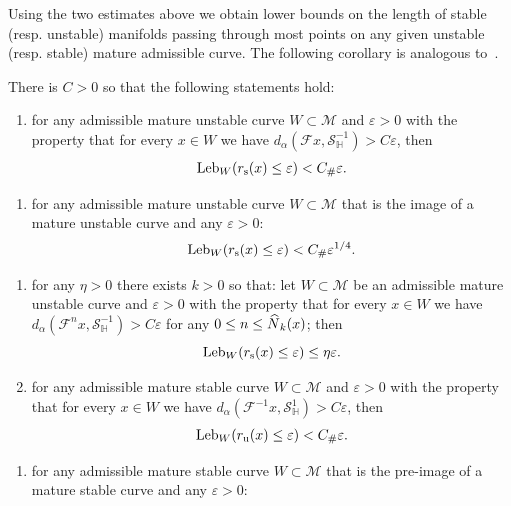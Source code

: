 \documentclass[10pt]{amsart}
\theoremstyle{definition}\newtheorem{defi}[theo]{Definition}\newtheorem{rema}[theo]{Remark}\newtheorem{exam}[theo]{Example}\newtheorem{exem}[theo]{Example}\newtheorem{nota}[theo]{Notation}
\newcommand{\eps}{\varepsilon}
\newcommand{\inv}{^{-1}}
\newcommand{\unstable}{\text{u}}
\newcommand{\stable}{\text{s}}
\newcommand{\homo}{\mathbb{H}}
\newcommand{\cm}{\mathcal{F}}
\newcommand{\csp}{\mathcal{M}}
\newcommand{\rs}{r_{\stable}}
\newcommand{\ru}{r_{\unstable}}
\newcommand{\singPrivate}{\mathcal{S}}
\newcommand{\hsing}[1]{{\singPrivate}_\homo^{#1}}
\newcommand{\admiss}{admissible}
\newcommand{\adm}{_{\alpha^{+}}}
\newcommand{\Np}{\hat N}
\newcommand{\Leb}{\textup{Leb}}
\newcommand{\Const}{C_\#}
\renewcommand{\adm}{_{\alpha}}
\newcommand*{\relabel}{\renewcommand{\labelenumi}{(\theenumi)}}
\newcommand*{\alphenumi}{\renewcommand*{\theenumi}{\alph{enumi}}\relabel}
\newcommand*{\alphenumipr}{\renewcommand*{\theenumi}{\alph{enumi}'}\relabel}
\let\oldhat\hat
\renewcommand*{\hat}[1]{\mathchoice{\widehat{#1}}{\widehat{#1}}{\oldhat{#1}}{\oldhat{#1}}}
\begin{document}
Using the two estimates above we obtain lower bounds on the length of stable (resp. unstable) manifolds passing through most points on any given unstable (resp. stable) mature admissible curve. The following corollary is analogous to~\cite[Theorems~5.66--5.67, \S5.12]{ChM}.


\begin{coro}\label{CorSize}
There is $C > 0$ so that the following
statements hold:
\begin{enumerate}\alphenumi
\item \label{coro7.10.a} for any \admiss{} mature unstable curve $W\subset\csp$ and $\eps > 0$ with the property that for every $x\in W$ we have $d\adm(\cm x,\hsing{-1}) > C\eps$, then
\begin{align*}
\Leb_{W}(\rs(x)\le\eps) < \Const \eps.
\end{align*}
\end{enumerate}
\begin{enumerate}\alphenumipr
\item \label{coro7.10.a'} for any \admiss{} mature unstable curve $W\subset\csp$ that is the image of a mature unstable curve and any $\eps > 0$:
\begin{align*}
\Leb_{W}(\rs(x)\le\eps) < \Const \eps^{1/4}.
\end{align*}
\end{enumerate}
\begin{enumerate}\alphenumi
\setcounter{enumi}{1}
\item\label{coro7.10.b} for any $\eta > 0$ there exists $k > 0$ so that: let $W\subset\csp$ be an \admiss{} mature unstable curve and $\eps > 0$ with the property that for every $x\in W$ we have $d_{\alpha}(\cm^{n}x,\hsing{-1}) > C \eps$ for any $0\le n \le \Np_{k}(x)$; then
\begin{equation}\label{ShortStable}
\Leb_W(\rs(x)\leq \eps)\leq\eta\eps.
\end{equation}
\item\label{coro7.10.c} for any \admiss{} mature stable curve $W\subset\csp$ and $\eps > 0$ with the property that for every $x\in W$ we have $d\adm(\cm\inv x,\hsing{1}) > C\eps$, then
\begin{align*}
\Leb_{W}(\ru(x)\le\eps) < \Const \eps.
\end{align*}
\end{enumerate}
\begin{enumerate}\alphenumipr
\setcounter{enumi}{2}
\item \label{coro7.10.c'} for any \admiss{} mature stable curve $W\subset\csp$ that is the pre-image of a mature stable curve and any $\eps > 0$:

\end{enumerate}
\end{coro}
\end{document}
